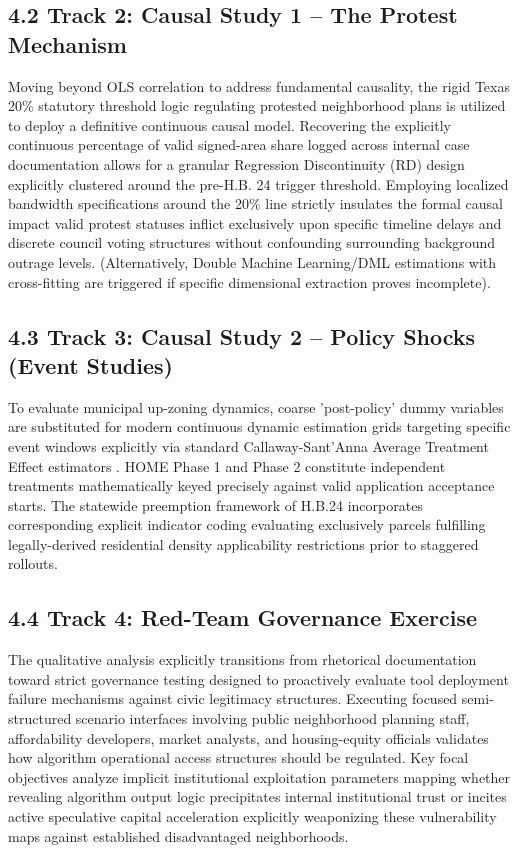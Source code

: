 \subsection*{4.2 Track 2: Causal Study 1 -- The Protest Mechanism}
Moving beyond OLS correlation to address fundamental causality, the rigid Texas 20\% statutory threshold logic regulating protested neighborhood plans is utilized to deploy a definitive continuous causal model. Recovering the explicitly continuous percentage of valid signed-area share logged across internal case documentation allows for a granular Regression Discontinuity (RD) design explicitly clustered around the pre-H.B. 24 trigger threshold. Employing localized bandwidth specifications around the 20\% line strictly insulates the formal causal impact valid protest statuses inflict exclusively upon specific timeline delays and discrete council voting structures without confounding surrounding background outrage levels. (Alternatively, Double Machine Learning/DML estimations with cross-fitting are triggered if specific dimensional extraction proves incomplete).

\subsection*{4.3 Track 3: Causal Study 2 -- Policy Shocks (Event Studies)}
To evaluate municipal up-zoning dynamics, coarse 'post-policy' dummy variables are substituted for modern continuous dynamic estimation grids targeting specific event windows explicitly via standard Callaway-Sant'Anna Average Treatment Effect estimators \cite{callaway2021difference}.  HOME Phase 1 and Phase 2 constitute independent treatments mathematically keyed precisely against valid application acceptance starts. The statewide preemption framework of H.B.24 incorporates corresponding explicit indicator coding evaluating exclusively parcels fulfilling legally-derived residential density applicability restrictions prior to staggered rollouts.

\subsection*{4.4 Track 4: Red-Team Governance Exercise}
The qualitative analysis explicitly transitions from rhetorical documentation toward strict governance testing designed to proactively evaluate tool deployment failure mechanisms against civic legitimacy structures. Executing focused semi-structured scenario interfaces involving public neighborhood planning staff, affordability developers, market analysts, and housing-equity officials validates how algorithm operational access structures should be regulated. Key focal objectives analyze implicit institutional exploitation parameters mapping whether revealing algorithm output logic precipitates internal institutional trust or incites active speculative capital acceleration explicitly weaponizing these vulnerability maps against established disadvantaged neighborhoods.


